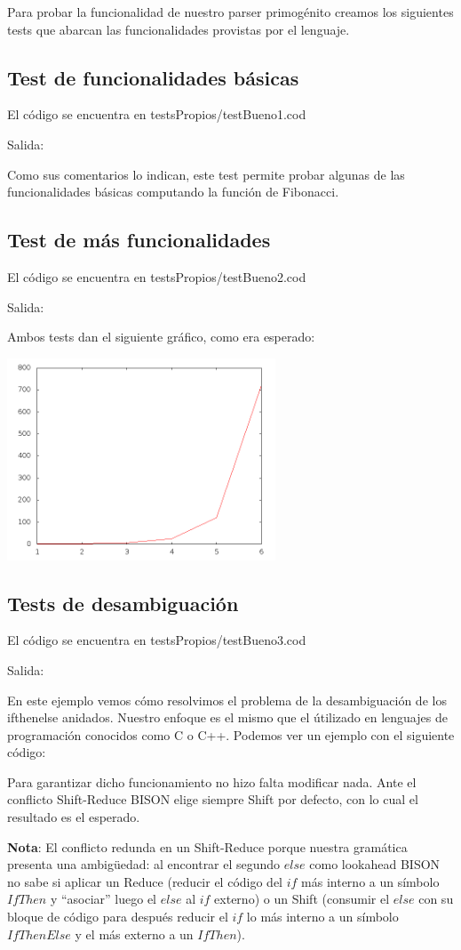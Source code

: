 Para probar la funcionalidad de nuestro parser primogénito creamos los siguientes tests que abarcan las funcionalidades provistas por el lenguaje.

\subsection{Test de funcionalidades básicas}
	El código se encuentra en testsPropios/testBueno1.cod
	
	Salida:
	

Como sus comentarios lo indican, este test permite probar algunas de las funcionalidades básicas computando la función de Fibonacci.

\subsection{Test de más funcionalidades}
	El código se encuentra en testsPropios/testBueno2.cod
	
	Salida:
	
	
Ambos tests dan el siguiente gráfico, como era esperado:

\includegraphics[width=0.60\textwidth,height=0.60\textheight,keepaspectratio]{testsPropios/graficoTest1.png}
\subsection{Tests de desambiguación}
	El código se encuentra en testsPropios/testBueno3.cod
	
	Salida:
	
	
	En este ejemplo vemos cómo resolvimos el problema de la desambiguación de los ifthenelse anidados. Nuestro enfoque es el mismo que el útilizado en lenguajes de programación conocidos como C o C++. Podemos ver un ejemplo con el siguiente código:
		
	
	Para garantizar dicho funcionamiento no hizo falta modificar nada. Ante el conflicto Shift-Reduce BISON elige siempre Shift por defecto, con lo cual el resultado es el esperado.
	
	\textbf{Nota}: El conflicto redunda en un Shift-Reduce porque nuestra gramática presenta una ambigüedad: al encontrar el segundo $else$ como lookahead BISON no sabe si aplicar un Reduce (reducir el código del $if$ más interno a un símbolo $IfThen$ y ``asociar'' luego el $else$ al $if$ externo) o un Shift (consumir el $else$ con su bloque de código para después reducir el $if$ lo más interno a un símbolo $IfThenElse$ y el más externo a un $IfThen$).